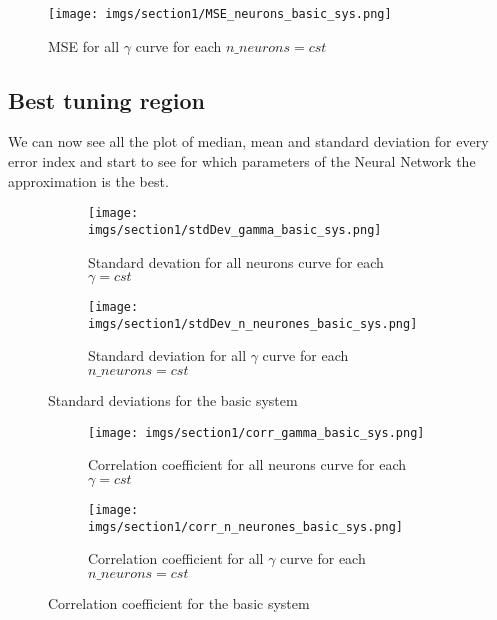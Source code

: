 \begin{figure}
    \centering
    \texttt{[image: imgs/section1/MSE\_neurons\_basic\_sys.png]}
    \caption{MSE for all \(\gamma\) curve for each \(n\_neurons = cst\)}
    \label{fig:MSE_neurons}
\end{figure}


\subsection{Best tuning region}
We can now see all the plot of median, mean and standard deviation for every error index %
and start to see for which parameters of the Neural Network the approximation is the best. %

\begin{figure}[htbp]
    \centering
    \begin{subfigure}{0.49\textwidth}
        \centering
        \texttt{[image: imgs/section1/stdDev\_gamma\_basic\_sys.png]}
        \caption{Standard devation for all neurons curve for each \(\gamma = cst\)}
        \label{fig:stdDev_gamma_basic_sys}
    \end{subfigure}
    \hfill
    \begin{subfigure}{0.49\textwidth}
        \centering
        \texttt{[image: imgs/section1/stdDev\_n\_neurones\_basic\_sys.png]}
        \caption{Standard deviation for all \(\gamma\) curve for each \(n\_neurons = cst\)}
        \label{fig:stdDev_n_neurones_basic_sys}
    \end{subfigure}
    \caption{Standard deviations for the basic system}
    \label{fig:Standard_deviations_for_the_basic_system}
\end{figure}

\begin{figure}[htbp]
    \centering
    \begin{subfigure}{0.49\textwidth}
        \centering
        \texttt{[image: imgs/section1/corr\_gamma\_basic\_sys.png]}
        \caption{Correlation coefficient for all neurons curve for each \(\gamma = cst\)}
        \label{fig:corr_gamma_basic_sys}
    \end{subfigure}
    \hfill
    \begin{subfigure}{0.49\textwidth}
        \centering
        \texttt{[image: imgs/section1/corr\_n\_neurones\_basic\_sys.png]}
        \caption{Correlation coefficient for all \(\gamma\) curve for each \(n\_neurons = cst\)}
        \label{fig:corr_n_neurones_basic_sys}
    \end{subfigure}
    \caption{Correlation coefficient for the basic system}
    \label{fig:Correlation_coefficient_for_the_basic_system}
\end{figure}


\newpage